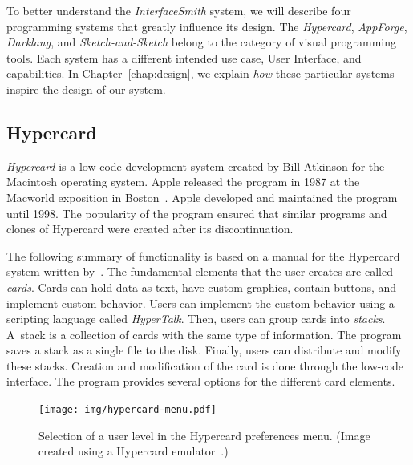 To better understand the \emph{InterfaceSmith} system, we will describe four programming systems that greatly influence its design.
The \emph{Hypercard}, \emph{AppForge}, \emph{Darklang}, and \emph{Sketch-and-Sketch} belong to the category of visual programming tools.
Each system has a different intended use case, User Interface, and capabilities.
In Chapter~\ref{chap:design}, we explain \emph{how} these particular systems inspire the design of our system.

\subsection{Hypercard}
\emph{Hypercard} is a low-code development system created by Bill Atkinson for the Macintosh operating system. Apple released the program in 1987 at the
Macworld exposition in Boston~\cite{hyper_release}. Apple developed and maintained the program until 1998.
The popularity of the program ensured that similar programs and clones of Hypercard were created after its discontinuation.

The following summary of functionality is based on a manual for the Hypercard system written by~\citet{goodman_hypertext}.
The fundamental elements that the user creates are called \emph{cards}. Cards can hold data as text, have custom graphics, contain buttons, and implement custom behavior.
Users can implement the custom behavior using a scripting language called \emph{HyperTalk}. Then, users can group cards into \emph{stacks}. A~stack is a collection of cards with the same type of information.
The program saves a stack as a single file to the disk. Finally, users can distribute and modify these stacks.
Creation and modification of the card is done through the low-code interface. The program provides several options for the different card elements.
\begin{figure}[htbp]
	\centering
	\texttt{[image: img/hypercard−menu.pdf]}
	\caption{Selection of a user level in the Hypercard preferences menu. (Image created using a Hypercard emulator~\cite{hypercard_emulator}.)}
	\label{fig:f}
\end{figure}

